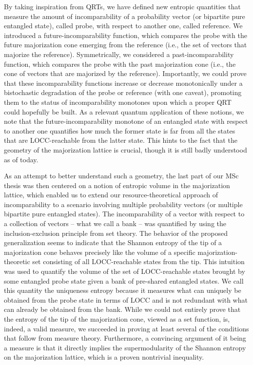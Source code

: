 By taking inspiration from QRTs, we have defined new entropic quantities that measure the amount of incomparability of a probability vector (or bipartite pure entangled state), called probe, with respect to another one, called reference. We introduced a future-incomparability function, which compares the probe with the future majorization cone emerging from the reference (i.e., the set of vectors that majorize the reference). Symmetrically, we considered a past-incomparability function, which compares the probe with the past majorization cone (i.e., the cone of vectors that are majorized by the reference). Importantly, we could prove that these incomparability functions increase or decrease monotonically under a bistochastic degradation of the probe or reference (with one caveat), promoting them to the status of incomparability monotones upon which a proper QRT could hopefully be built. As a relevant quantum application of these notions, we note that the future-incomparability monotone of an entangled state with respect to another one quantifies how much the former state is far from all the states that are LOCC-reachable from the latter state. This hints to the fact that the geometry of the majorization lattice is crucial, though it is still badly understood as of today. 

As an attempt to better understand such a geometry, the last part of our MSc thesis was then centered on a notion of entropic volume in the majorization lattice, which enabled us to extend our resource-theoretical approach of incomparability to a scenario involving multiple probability vectors (or multiple bipartite pure entangled states). The incomparability of a vector with respect to a collection of vectors – what we call a bank – was quantified by using the inclusion-exclusion principle from set theory. The behavior of the proposed generalization seems to indicate that the Shannon entropy of the tip of a majorization cone behaves precisely like the volume of a specific majorization-theoretic set consisting of all LOCC-reachable states from the tip. This intuition was used to quantify the volume of the set of LOCC-reachable states brought by some entangled probe state given a bank of pre-shared entangled states. We call this quantity the uniqueness entropy because it measures what can uniquely be obtained from the probe state in terms of LOCC and is not redundant with what can already be obtained from the bank. While we could not entirely prove that the entropy of the tip of the majorization cone, viewed as a set function, is, indeed, a valid measure, we succeeded in proving at least several of the conditions that follow from measure theory. Furthermore, a convincing argument of it being a measure is that it directly implies the supermodularity of the Shannon entropy on the majorization lattice, which is a proven nontrivial inequality.

